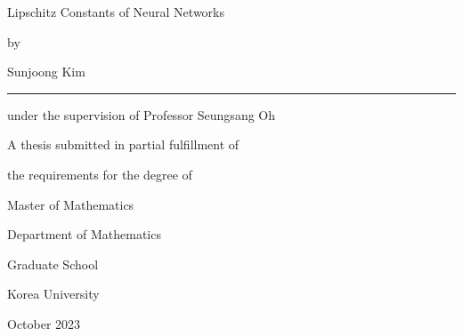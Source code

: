 \documentclass[11pt]{report}
\begin{document}
\newpage 
\begin{center}
\huge Lipschitz Constants of Neural Networks
\par\vspace{3.1cm} %
{\fontsize{16pt}{16pt}\selectfont by \par Sunjoong Kim \par}
\vspace{0.5cm}
\rule{.6\textwidth}{0.4pt} %
\par\vspace{0.2cm}
{\fontsize{16pt}{16pt}\selectfont under the supervision of Professor Seungsang Oh \par}
\vspace{0.7cm}
{\fontsize{16pt}{18pt}\selectfont A thesis submitted in partial fulfillment of \par
 the requirements for the degree of \par Master of Mathematics \par }   
\vspace{10pt}
{\fontsize{16pt}{16pt}\selectfont Department of Mathematics} %
\par\vspace{1.5cm}
{\fontsize{18pt}{18pt}\selectfont Graduate School \par \vspace{0.5cm}
 Korea University \par} 
\vspace{1cm}
{\fontsize{14pt}{14pt}\selectfont October 2023} %
\end{center}

\end{document}
